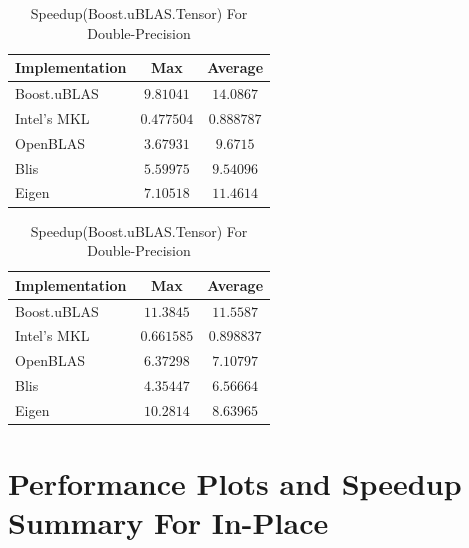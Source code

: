 \begin{table}[ht]
    \centering
    \caption{Speedup(Boost.uBLAS.Tensor) For Single-Precision}
    \begin{tabular}{|l|c|c|}
        \hline
        \textbf{Implementation} & \textbf{Max} & \textbf{Average}\\
        \hline
        Boost.uBLAS         & $9.81041$& $14.0867$ \\
        \hline
        Intel's MKL         & $0.477504$& $0.888787$ \\
        \hline
        OpenBLAS            & $3.67931$& $9.6715$ \\
        \hline
        Blis                & $5.59975$& $9.54096$ \\
        \hline
        Eigen               & $7.10518$& $11.4614$ \\
        \hline
    \end{tabular}

    \vspace*{1 cm}

    \centering
    \caption{Speedup(Boost.uBLAS.Tensor) For Double-Precision}
    \begin{tabular}{|l|c|c|}
        \hline
        \textbf{Implementation} & \textbf{Max} & \textbf{Average}\\
        \hline
        Boost.uBLAS         & $11.3845$& $11.5587$ \\
        \hline
        Intel's MKL         & $0.661585$& $0.898837$ \\
        \hline
        OpenBLAS            & $6.37298$& $7.10797$ \\
        \hline
        Blis                & $4.35447$& $6.56664$ \\
        \hline
        Eigen               & $10.2814$& $8.63965$ \\
        \hline
    \end{tabular}
\end{table}


\clearpage
\section{Performance Plots and Speedup Summary For In-Place}

